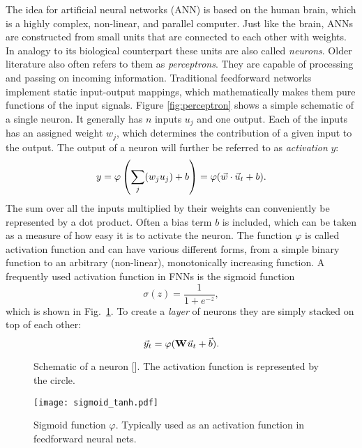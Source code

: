 The idea for artificial neural networks (ANN) is based on the human brain,
which is a highly complex, non-linear, and parallel computer.  Just like the
brain, ANNs are constructed from small units that are connected to each other
with weights. In analogy to its biological counterpart these units are also
called \emph{neurons}. Older literature also often refers to them as
\emph{perceptrons}.  They are capable of processing and passing on incoming
information.
Traditional feedforward networks implement static input-output mappings, which
mathematically makes them pure functions of the input signals.
Figure \ref{fig:perceptron} shows a simple schematic of a single
neuron.  It generally has $n$ inputs $u_j$ and one output.  Each of the inputs
has an assigned weight $w_j$, which determines the contribution of a given
input to the output.  The output of a neuron will further be referred to as
\emph{activation} $y$:
\begin{equation}
  \label{eq:ffn_eq}
  y = \varphi \left( \sum_j (w_j u_j) + b  \right)
       = \varphi (\vec{w} \cdot \vec{u}_t + b).
\end{equation}
The sum over all the inputs multiplied by their weights can conveniently be
represented by a dot product.  Often a bias term $b$ is included, which can be
taken as a measure of how easy it is to activate the neuron.  The function
$\varphi$ is called activation function and can have various different forms,
from a simple binary function to an arbitrary (non-linear), monotonically
increasing function.  A frequently used activation function in FNNs is the
sigmoid function
\begin{equation}
  \sigma (z) = \frac{1}{1 + e^{-z}},
\end{equation}
which is shown in Fig.~\ref{fig:sigmoid}. To create a \emph{layer} of neurons
they are simply stacked on top of each other:
\begin{equation}
  \vec{y}_t = \varphi (\boldsymbol{\textbf{W}}^{\text{}} \vec{u}_t + \vec{b}).
\end{equation}

\begin{figure}
  \begin{minipage}{.42\textwidth}
    \centering
    \Perceptron
    \caption{Schematic of a neuron [\cite{Nielsen2015}].
    The activation function is represented by the circle.}
    \label{fig:perceptron}
  \end{minipage}
  \hspace{.02\textwidth}
  \begin{minipage}{.54\textwidth}
    \centering
    \texttt{[image: sigmoid\_tanh.pdf]}
    \caption{Sigmoid function $\varphi$. Typically used as an activation function
    in feedforward neural nets.}
    \label{fig:sigmoid}
  \end{minipage}
\end{figure}

